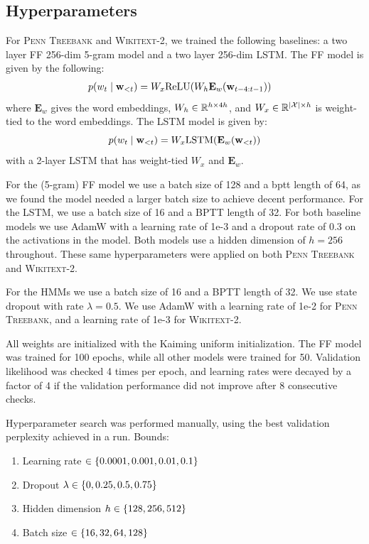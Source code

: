 \documentclass[11pt,a4paper]{article}
\begin{document}
\subsection{Hyperparameters}
\label{sec:hyperparams}

For \textsc{Penn Treebank} and \textsc{Wikitext-2}, we trained the following baselines:
a two layer FF 256-dim 5-gram model and a two layer 256-dim LSTM.
The FF model is given by the following:
\begin{equation}
\begin{aligned}
p(w_t \mid \mathbf{w}_{<t})
&= W_x\textrm{ReLU}(W_h\mathbf{E}_w(\mathbf{w}_{t-4:t-1}))
\end{aligned}
\end{equation}
where $\mathbf{E}_w$ gives the word embeddings,
$W_h\in\mathbb{R}^{h\times 4h}$, and
$W_x\in\mathbb{R}^{|\mathcal{X}|\times h}$ is weight-tied to the word embeddings.
The LSTM model is given by:
\begin{equation}
p(w_t \mid \mathbf{w}_{<t})
= W_x \textrm{LSTM}(\mathbf{E}_w(\mathbf{w}_{<t}))
\end{equation}
with a 2-layer LSTM
that has weight-tied $W_x$ and $\mathbf{E}_w$.

For the (5-gram) FF model we use a batch size of 128 and a bptt length of 64,
as we found the model needed a larger batch size to achieve decent performance.
For the LSTM, we use a batch size of 16 and a BPTT length of 32.
For both baseline models we use AdamW \citep{adamw} with a learning rate of 1e-3 and a dropout rate of 0.3 on the activations in the model.
Both models use a hidden dimension of $h=256$ throughout.
These same hyperparameters were applied on both \textsc{Penn Treebank} and \textsc{Wikitext-2}.

For the HMMs we use a batch size of 16 and a BPTT length of 32.
We use state dropout with rate $\lambda = 0.5$.
We use AdamW \citep{adamw} with a learning rate of 1e-2 for \textsc{Penn Treebank},
and a learning rate of 1e-3 for \textsc{Wikitext-2}.

All weights are initialized with the Kaiming uniform initialization.
The FF model was trained for 100 epochs, while all other models were trained for 50.
Validation likelihood was checked 4 times per epoch, and
learning rates were decayed by a factor of 4 if the validation performance
did not improve after 8 consecutive checks.

Hyperparameter search was performed manually, using the best
validation perplexity achieved in a run.
Bounds:
\begin{enumerate}
\item Learning rate $\in \left\{0.0001, 0.001, 0.01, 0.1\right\}$
\item Dropout $\lambda \in \left\{0, 0.25, 0.5, 0.75\right\}$
\item Hidden dimension $h \in \left\{128,256,512\right\}$
\item Batch size $\in \left\{16, 32, 64, 128\right\}$
\end{enumerate}
\end{document}
